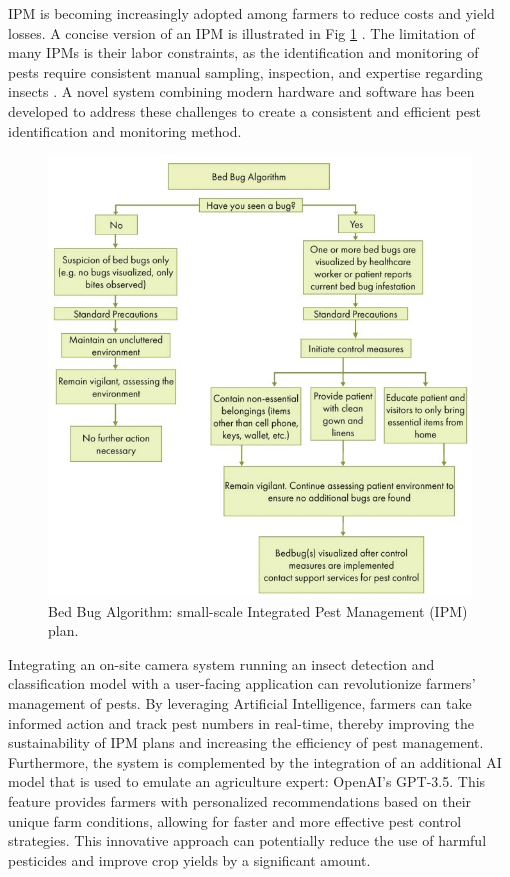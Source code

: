 IPM is becoming increasingly adopted among farmers to reduce costs and yield losses. A concise version of an IPM is illustrated in Fig \ref{fig:1.3} \cite{hardy_lesher_olson_2021}. The limitation of many IPMs is their labor constraints, as the identification and monitoring of pests require consistent manual sampling, inspection, and expertise regarding insects \cite{zehnder_2009}. A novel system combining modern hardware and software has been developed to address these challenges to create a consistent and efficient pest identification and monitoring method.

\begin{figure}[H]
\begin{center}
\includegraphics[width=0.95\linewidth]{Honors_Thesis/Figures/1.3.jpg}
\end{center}
\caption{Bed Bug Algorithm: small-scale Integrated Pest Management (IPM) plan.}
\label{fig:1.3}
\end{figure}

Integrating an on-site camera system running an insect detection and classification model with a user-facing application can revolutionize farmers' management of pests. By leveraging Artificial Intelligence, farmers can take informed action and track pest numbers in real-time, thereby improving the sustainability of IPM plans and increasing the efficiency of pest management. Furthermore, the system is complemented by the integration of an additional AI model that is used to emulate an agriculture expert: OpenAI's GPT-3.5. This feature provides farmers with personalized recommendations based on their unique farm conditions, allowing for faster and more effective pest control strategies. This innovative approach can potentially reduce the use of harmful pesticides and improve crop yields by a significant amount.
